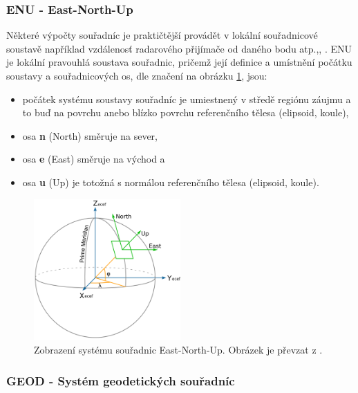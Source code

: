 \documentclass[11pt,a4paper]{article}
\begin{document}
\subsubsection{ENU - East-North-Up}

Některé výpočty souřadníc je praktičtější provádět v lokální souřadnicové soustavě například vzdálenosť radarového přijímače od daného bodu atp.,\cite{Kovar2016}, \cite{Mayer2002}. ENU je lokální pravouhlá soustava souřadnic, pričemž její definice a umístnění počátku soustavy a souřadnicových os, dle značení na obrázku \ref{fig:enu}, jsou:
 
\begin{itemize}
\item počátek systému soustavy souřadníc je umiestnený v středě regiónu záujmu a to  buď na povrchu anebo blízko povrchu referenčního tělesa (elipsoid, koule),
\item osa \textbf{n} (North) směruje na sever, 
\item osa \textbf{e} (East) směruje na východ a 
\item osa \textbf{u} (Up) je totožná s normálou referenčního tělesa (elipsoid, koule). 
\end{itemize}

\begin{figure}[ht!]
\begin{center}

\includegraphics[width=0.50\textwidth]{FIG/enu_wiki}
\caption{Zobrazení systému souřadnic East-North-Up. Obrázek je převzat z \cite{enuWiki}.}
\label{fig:enu}
\end{center}
\end{figure}

\subsubsection{GEOD - Systém geodetických souřadníc}
\end{document}
